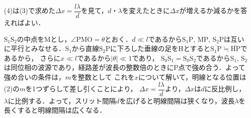 \begin{reidaiunit}
\begin{sisinE}
(4)は(3)で求めた$\Delta x=\dfrac{l\lambda}{d}$を見て，$d$・$\lambda$を変えたときに$\Delta x$が増えるか減るかを答えればよい．
\end{sisinE}


\begin{kaitou}
\begin{komon}
 $\overline{\mathrm{S_1S_2}}$の中点を$\mathrm{M}$とし，$\angle\mathrm{PMO}=\theta$とおく．$d\ll l$であるから$\mathrm{S_1P}$, $\mathrm{MP}$, $\mathrm{S_2P}$は互いに平行とみなせる．$\mathrm{S_1}$から直線$\mathrm{S_2P}$に下ろした垂線の足を$\mathrm{H}$とすると$\overline{\mathrm{S_1P}}\fallingdotseq\overline{\mathrm{HP}}$であるから，
       さらに$x\ll l$であるから$|\theta|\ll 1$であり，
 $\overline{\mathrm{S_0S_1}}=\overline{\mathrm{S_0S_2}}$であるから$\mathrm{S_1}$, $\mathrm{S_2}$は同位相の波源であり，経路差が波長の整数倍のときに$\mathrm{P}$点で強め合う．よって強め合いの条件は，$m$を整数として
       これを$x$について解いて，明線となる位置は
 (2)の$m$を1つずらして差し引くことにより，
 $\Delta x=\dfrac{l\lambda}{d}$より，$\Delta x$は$d$に反比例し，$\lambda$に比例する．よって，スリット間隔$d$を広げると明線間隔は{\gtfamily 狭くなり}，波長$\lambda$を長くすると明線間隔は{\gtfamily 広くなる}．\hspace*{\fill}\Ans
\end{komon}
\end{kaitou}
\end{reidaiunit}

